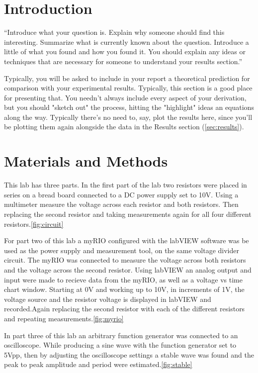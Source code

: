 \documentclass[10pt,twocolumn]{article}
\begin{document}


\section{Introduction} 
\label{sec:introduction}

 ``Introduce what your question is. Explain why someone should find this interesting. Summarize what is currently known about the question. Introduce a little of what you found and how you found it. You should explain any ideas or techniques that are necessary for someone to understand your results section.''

Typically, you will be asked to include in your report a theoretical prediction for comparison with your experimental results. Typically, this section is a good place for presenting that. You needn't always include every aspect of your derivation, but you should "sketch out" the process, hitting the "highlight" ideas an equations along the way. Typically there's no need to, say, plot the results here, since you'll be plotting them again alongside the data in the Results section (\autoref{sec:results}). 

\section{Materials and Methods}

	This lab has three parts. In the first part of the lab two resistors were placed in series on a bread board connected to a DC power supply set to 10V. Using a multimeter measure the voltage across each resistor and both resistors. Then replacing the second resistor and taking measurements again for all four different resistors.\autoref{fig:circuit}
	
	
	For part two of this lab a myRIO configured with the labVIEW software was be used as the power supply and measurement tool, on the same voltage divider circuit. The myRIO was connected to measure the voltage across both resistors and the voltage across the second resistor. Using labVIEW an analog output and input were made to recieve data from the myRIO, as well as a voltage vs time chart window. Starting at 0V and working up to 10V, in increments of 1V, the voltage source and the resistor voltage is displayed in labVIEW and recorded.Again replacing the second resistor with each of the different resistors and repeating measurements.\autoref{fig:myrio} 
	

	In part three of this lab an arbitrary function generator was connected to an oscilloscope. While producing a sine wave with the function generator set to 5Vpp, then by adjusting the oscilloscope settings a stable wave was found and the peak to peak amplitude and period were estimated.\autoref{fig:stable}
	
\end{document}
